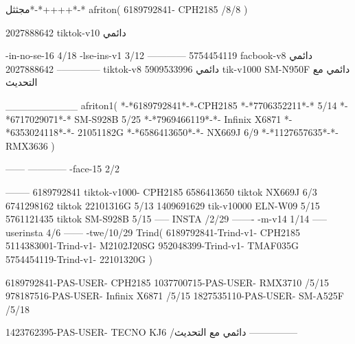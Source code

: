 مجثثل*-*++++*-*
afriton(
6189792841- CPH2185  /8/8
)

2027888642 tiktok-v10
دائمي

-in-no-se-16 4/18
-lse-ins-v1 3/12
------------
5754454119 facbook-v8
دائمي
--------------
2027888642 tiktok-v8
دائمي
5909533996 tik-v1000  SM-N950F
دائمي مع التحديث

__________
afriton1(
*-*6189792841*-*-CPH2185
*-*7706352211*-* 5/14
*-*6717029071*-*  SM-S928B 5/25
*-*7969466119*-*- Infinix X6871 \5
*-*6353024118*-*- 21051182G \5
*-*6586413650*-*- NX669J  6/9
*-*1127657635*-*- RMX3636 \5
)


------
------------
-face-15 2/2

--------
6189792841 tiktok-v1000- CPH2185 
6586413650 tiktok NX669J  6/3
6741298162 tiktok 22101316G  5/13
1409691629 tik-v10000 ELN-W09  5/15
5761121435 tiktok SM-S928B   5/15
-----
 INSTA /2/29
-------
-m-v14 1/14
-----
userinsta 4/6
------
-twe/10/29
Trind(
6189792841-Trind-v1- CPH2185 
5114383001-Trind-v1- M2102J20SG \5
952048399-Trind-v1- TMAF035G \5
5754454119-Trind-v1- 22101320G \5
)

6189792841-PAS-USER- CPH2185 
1037700715-PAS-USER- RMX3710  /5/15
978187516-PAS-USER- Infinix X6871  /5/15
1827535110-PAS-USER- SM-A525F  /5/18

1423762395-PAS-USER- TECNO KJ6  /دائمي مع التحديث
    ---------------
